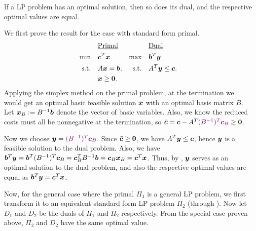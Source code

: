 \begin{enumerate}
\begin{theorem}
\label{thm:strong-duality}
If a LP problem has an optimal solution, then so does its dual, and the
respective optimal values are equal.
\end{theorem}
\begin{pf}
We first prove the result for the case with standard form primal.
\begin{align*}
&\text{\underline{Primal}}&&\text{\underline{Dual}} \\
\text{min}\quad&\bm{c}^{T}\bm{x}&\text{max}\quad&\bm{b}^{T}\bm{y} \\
\text{s.t.}\quad&A\bm{x}=\bm{b},&\text{s.t.}\quad&A^{T}\bm{y}\le\bm{c}. \\
\quad&\bm{x}\ge\bm{0}.
\end{align*}
Applying the simplex method on the primal problem, at the termination we would
get an optimal basic feasible solution \(\bm{x}\) with an optimal basis
matrix \(B\). Let \(\bm{x}_{B}:=B^{-1}\bm{b}\) denote the vector of basic
variables. Also, we know the reduced costs must all be nonnegative at the
termination, so
\(\bar{\vect{c}}=\vect{c}-A^{T}\vc{(B^{-1})^{T}\vect{c}_{B}}\ge\vect{0}\).

Now we choose \(\vect{y}=\vc{(B^{-1})^{T}\vect{c}_{B}}\). Since
\(\bar{\bm{c}}\ge\bm{0}\), we have \(A^{T}\bm{y}\le\bm{c}\), hence
\(\bm{y}\) is a feasible solution to the dual problem. Also, we have
\(\bm{b}^{T}\bm{y}=\bm{b}^{T}(B^{-1})^{T}\bm{c}_{B}
=\bm{c}_{B}^{T}B^{-1}\bm{b}=\bm{c}_{B}\bm{x}_{B}=\bm{c}^{T}\bm{x}\).
Thus, by , \(\bm{y}\) serves as an optimal
solution to the dual problem, and also the respective optimal values are equal
as \(\bm{b}^{T}\bm{y}=\bm{c}^{T}\bm{x}\).

Now, for the general case where the primal \(\Pi_1\) is a general LP problem,
we first transform it to an equivalent standard form LP problem \(\Pi_2\)
(through ). Now let \(D_1\) and \(D_2\) be the
duals of \(\Pi_1\) and \(\Pi_2\) respectively. From the special case proven
above, \(\Pi_2\) and \(D_2\) have the same optimal value.


\end{pf}
\end{enumerate}
